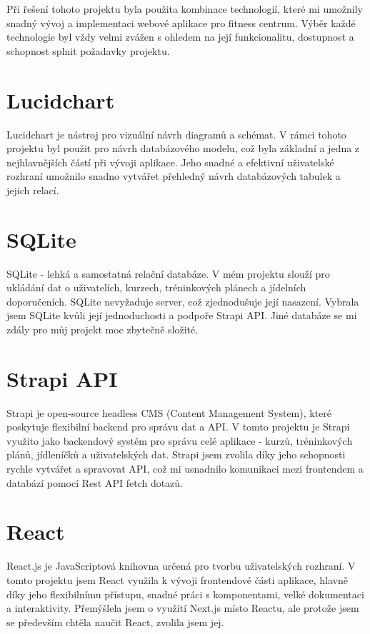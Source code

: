 \documentclass[12pt, a4paper,
twoside,        %
openany
]{report}
\begin{document}
Při řešení tohoto projektu byla použita kombinace technologií, které mi umožnily snadný vývoj a implementaci webové aplikace pro fitness centrum. Výběr každé technologie byl vždy velmi zvážen s ohledem na její funkcionalitu, dostupnost a schopnost splnit požadavky projektu. 

\section{Lucidchart}
Lucidchart je nástroj pro vizuální návrh diagramů a schémat. V rámci tohoto projektu byl použit pro návrh databázového modelu, což byla základní a jedna z nejhlavnějších částí při vývoji aplikace. Jeho snadné a efektivní uživatelské rozhraní umožnilo snadno vytvářet přehledný návrh databázových tabulek a jejich relací. 

\section{SQLite}
SQLite - lehká a samostatná relační databáze. V mém projektu slouží pro ukládání dat o uživatelích, kurzech, tréninkových plánech a jídelních doporučeních. SQLite nevyžaduje server, což zjednodušuje její nasazení. Vybrala jsem SQLite kvůli její jednoduchosti a podpoře Strapi API. Jiné databáze se mi zdály pro můj projekt moc zbytečně složité.

\section{Strapi API}

Strapi je open-source headless CMS (Content Management System), které poskytuje flexibilní backend pro správu dat a API. V tomto projektu je Strapi využito jako backendový systém pro správu celé aplikace - kurzů, tréninkových plánů, jídleníčků a uživatelských dat. Strapi jsem zvolila díky jeho schopnosti rychle vytvářet a spravovat API, což mi usnadnilo komunikaci mezi frontendem a databází pomocí Rest API fetch dotazů.

 \vspace{18pt}
        \clearpage 

\section{React}
React.js je JavaScriptová knihovna určená pro tvorbu uživatelských rozhraní. V tomto projektu jsem React využila k vývoji frontendové části aplikace, hlavně díky jeho flexibilnímu přístupu, snadné práci s komponentami, velké dokumentaci a interaktivity. Přemýšlela jsem o využítí Next.js místo Reactu, ale protože jsem se především chtěla naučit React, zvolila jsem jej.
\end{document}
